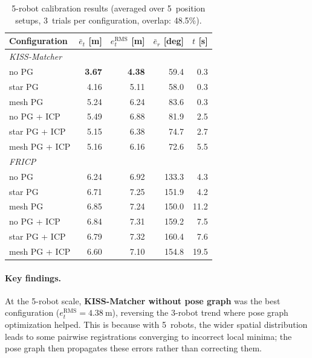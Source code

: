 \begin{table}[htbp]
    \centering
    \caption{5-robot calibration results (averaged over 5~position
             setups, 3~trials per configuration, overlap: 48.5\%).}
    \label{tab:results_5r}
    \small
    \begin{tabular}{l r r r r}
        \toprule
        \textbf{Configuration}
            & $\bar{e}_t$ [m]
            & $e_t^\mathrm{RMS}$ [m]
            & $\bar{e}_r$ [deg]
            & $t$ [s] \\
        \midrule
        \multicolumn{5}{l}{\textit{KISS-Matcher}} \\
        \quad no PG             & \textbf{3.67}  & \textbf{4.38}  & 59.4  & 0.3 \\
        \quad star PG           & 4.16  & 5.11  & 58.0  & 0.3 \\
        \quad mesh PG           & 5.24  & 6.24  & 83.6  & 0.3 \\
        \quad no PG + ICP       & 5.49  & 6.88  & 81.9  & 2.5 \\
        \quad star PG + ICP     & 5.15  & 6.38  & 74.7  & 2.7 \\
        \quad mesh PG + ICP     & 5.16  & 6.16  & 72.6  & 5.5 \\
        \midrule
        \multicolumn{5}{l}{\textit{FRICP}} \\
        \quad no PG             & 6.24  & 6.92  & 133.3 & 4.3 \\
        \quad star PG           & 6.71  & 7.25  & 151.9 & 4.2 \\
        \quad mesh PG           & 6.85  & 7.24  & 150.0 & 11.2 \\
        \quad no PG + ICP       & 6.84  & 7.31  & 159.2 & 7.5 \\
        \quad star PG + ICP     & 6.79  & 7.32  & 160.4 & 7.6 \\
        \quad mesh PG + ICP     & 6.60  & 7.10  & 154.8 & 19.5 \\
        \bottomrule
    \end{tabular}
\end{table}

\paragraph{Key findings.}
At the 5-robot scale, \textbf{KISS-Matcher without pose graph} was
the best configuration ($e_t^\mathrm{RMS} = \SI{4.38}{\metre}$),
reversing the 3-robot trend where pose graph optimization helped.
This is because with 5~robots, the wider spatial distribution leads
to some pairwise registrations converging to incorrect local minima;
the pose graph then propagates these errors rather than correcting
them.


